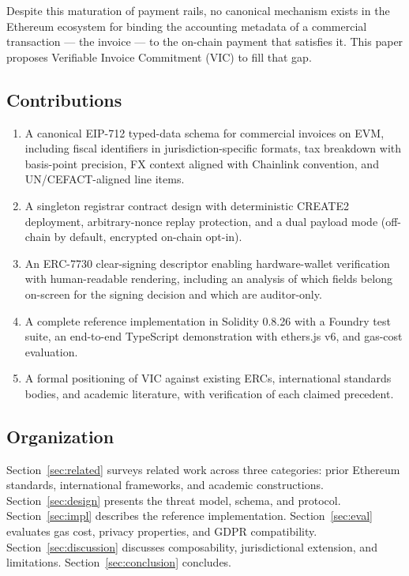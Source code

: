 \documentclass[11pt,a4paper]{article}
\begin{document}
Despite this maturation of payment rails, no canonical mechanism exists in the Ethereum ecosystem for binding the accounting metadata of a commercial transaction --- the invoice --- to the on-chain payment that satisfies it. This paper proposes Verifiable Invoice Commitment (VIC) to fill that gap.

\subsection{Contributions}

\begin{enumerate}[leftmargin=*]
  \item A canonical EIP-712 typed-data schema for commercial invoices on EVM, including fiscal identifiers in jurisdiction-specific formats, tax breakdown with basis-point precision, FX context aligned with Chainlink convention, and UN/CEFACT-aligned line items.
  \item A singleton registrar contract design with deterministic CREATE2 deployment, arbitrary-nonce replay protection, and a dual payload mode (off-chain by default, encrypted on-chain opt-in).
  \item An ERC-7730 clear-signing descriptor enabling hardware-wallet verification with human-readable rendering, including an analysis of which fields belong on-screen for the signing decision and which are auditor-only.
  \item A complete reference implementation in Solidity 0.8.26 with a Foundry test suite, an end-to-end TypeScript demonstration with ethers.js v6, and gas-cost evaluation.
  \item A formal positioning of VIC against existing ERCs, international standards bodies, and academic literature, with verification of each claimed precedent.
\end{enumerate}

\subsection{Organization}

Section~\ref{sec:related} surveys related work across three categories: prior Ethereum standards, international frameworks, and academic constructions. Section~\ref{sec:design} presents the threat model, schema, and protocol. Section~\ref{sec:impl} describes the reference implementation. Section~\ref{sec:eval} evaluates gas cost, privacy properties, and GDPR compatibility. Section~\ref{sec:discussion} discusses composability, jurisdictional extension, and limitations. Section~\ref{sec:conclusion} concludes.
\end{document}
